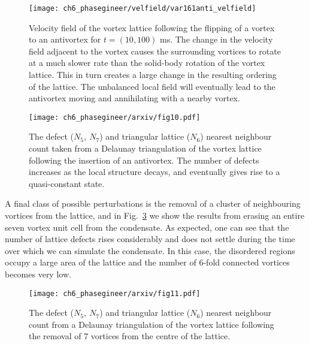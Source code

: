 \begin{figure}\centering
    \texttt{[image: ch6\_phasegineer/velfield/var161anti\_velfield]}
    \caption{Velocity field of the vortex lattice following the flipping of a vortex to an antivortex for $t=(10,100)$ ms. The change in the velocity field adjacent to the vortex causes the surrounding vortices to rotate at a much slower rate than the solid-body rotation of the vortex lattice. This in turn creates a large change in the resulting ordering of the lattice. The unbalanced local field will eventually lead to the antivortex moving and annihilating with a nearby vortex.}
    \label{fig:varr161anti_velfield}
\end{figure}


\begin{figure}\centering
    \texttt{[image: ch6\_phasegineer/arxiv/fig10.pdf]}
    \caption{The defect ($N_5,~N_7$) and triangular lattice ($N_6$) nearest neighbour count taken from a Delaunay triangulation of the vortex lattice following the insertion of an antivortex. The number of defects increases as the local structure decays, and eventually gives rise to a quasi-constant state.}\label{fig:varr161anti_defect}
\end{figure}

A final class of possible perturbations is the removal of a cluster of neighbouring vortices from the lattice, and in Fig.~\ref{fig:remove7_defect} we show the results from erasing an entire seven vortex unit cell from the condensate. As expected, one can see that the number of lattice defects rises considerably and does not settle during the time over which we can simulate the condensate. In this case, the disordered regions occupy a large area of the lattice and the number of 6-fold connected vortices becomes very low.

\begin{figure}\centering
    \texttt{[image: ch6\_phasegineer/arxiv/fig11.pdf]}
    \caption{The defect ($N_5,~N_7$) and triangular lattice ($N_6$) nearest neighbour count from a Delaunay triangulation of the vortex lattice following the removal of 7 vortices from the centre of the lattice. }\label{fig:remove7_defect}
\end{figure}

